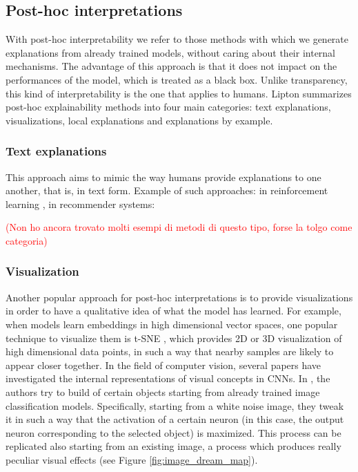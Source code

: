 \subsection{Post-hoc interpretations}
\label{subsec:posthoc}

With post-hoc interpretability we refer to those methods with which we generate explanations from already trained models, without caring about their internal mechanisms. The advantage of this approach is that it does not impact on the performances of the model, which is treated as a black box. Unlike transparency, this kind of interpretability is the one that applies to humans.
Lipton \cite{lipton2017mythos} summarizes post-hoc explainability  methods into four main categories: text explanations, visualizations, local explanations and explanations by example.

\subsubsection{Text explanations}
This approach aims to mimic the way humans provide explanations to one another, that is, in text form. Example of such approaches: in reinforcement learning \cite{krening2017leaning}, in recommender systems: 
\cite{mcauley2013hidden} 

\textcolor{red}{(Non ho ancora trovato molti esempi di metodi di questo tipo, forse la tolgo come categoria)}



\subsubsection{Visualization}
Another popular approach for post-hoc interpretations is to provide visualizations in order to have a qualitative idea of what the model has learned. For example, when models learn embeddings in high dimensional vector spaces, one popular technique to visualize them is t-SNE \cite{laurens2008tsne}, which provides 2D or 3D visualization of high dimensional data points, in such a way that nearby samples are likely to appear closer together. In the field of computer vision, several papers have investigated the internal representations of visual concepts in CNNs. In \cite{mordvintsev2015inceptionism}, the authors try to build  of certain objects starting from already trained image classification models. Specifically, starting from a white noise image, they tweak it in such a way that the activation of a certain neuron (in this case, the output neuron corresponding to the selected object) is maximized. This process can be replicated also starting from an existing image, a process which produces really peculiar visual effects (see Figure \ref{fig:image_dream_map}). 

